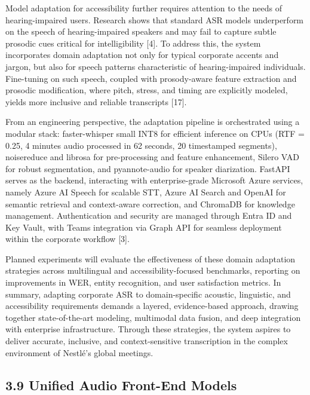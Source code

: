 \documentclass[12pt,a4paper]{article}
\begin{document}
Model adaptation for accessibility further requires attention to the needs of hearing-impaired users. Research shows that standard ASR models underperform on the speech of hearing-impaired speakers and may fail to capture subtle prosodic cues critical for intelligibility [4]. To address this, the system incorporates domain adaptation not only for typical corporate accents and jargon, but also for speech patterns characteristic of hearing-impaired individuals. Fine-tuning on such speech, coupled with prosody-aware feature extraction and prosodic modification, where pitch, stress, and timing are explicitly modeled, yields more inclusive and reliable transcripts [17].


From an engineering perspective, the adaptation pipeline is orchestrated using a modular stack: faster-whisper small INT8 for efficient inference on CPUs (RTF = 0.25, 4 minutes audio processed in 62 seconds, 20 timestamped segments), noisereduce and librosa for pre-processing and feature enhancement, Silero VAD for robust segmentation, and pyannote-audio for speaker diarization. FastAPI serves as the backend, interacting with enterprise-grade Microsoft Azure services, namely Azure AI Speech for scalable STT, Azure AI Search and OpenAI for semantic retrieval and context-aware correction, and ChromaDB for knowledge management. Authentication and security are managed through Entra ID and Key Vault, with Teams integration via Graph API for seamless deployment within the corporate workflow [3].


Planned experiments will evaluate the effectiveness of these domain adaptation strategies across multilingual and accessibility-focused benchmarks, reporting on improvements in WER, entity recognition, and user satisfaction metrics. In summary, adapting corporate ASR to domain-specific acoustic, linguistic, and accessibility requirements demands a layered, evidence-based approach, drawing together state-of-the-art modeling, multimodal data fusion, and deep integration with enterprise infrastructure. Through these strategies, the system aspires to deliver accurate, inclusive, and context-sensitive transcription in the complex environment of Nestlé’s global meetings.


\subsection{3.9 Unified Audio Front-End Models}
\end{document}
